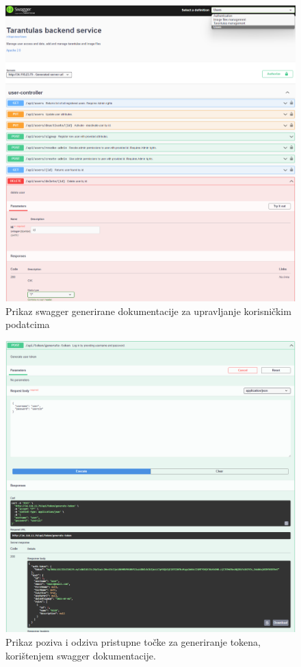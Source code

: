 \documentclass[a4paper,12pt,oneside]{article}
\begin{document}
\begin{figure}
    \centering
    \includegraphics[width=1\linewidth]{Slike/swagger-ui.png}
    \caption{Prikaz swagger generirane dokumentacije za upravljanje korisničkim podatcima}
    \label{fig:swagger-ui}
\end{figure}

\begin{figure}
    \centering
    \includegraphics[width=1\linewidth]{Slike/swagger-api-call.png}
    \caption{Prikaz poziva i odziva pristupne točke za generiranje tokena, korištenjem swagger dokumentacije.}
    \label{fig:swagger-api-call}
\end{figure}
\end{document}

